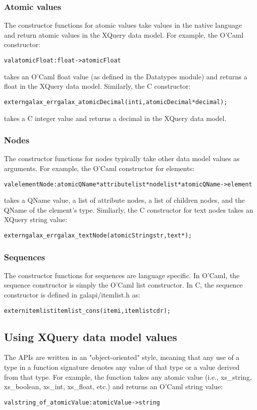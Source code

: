\subsubsection{Atomic values}
  The constructor functions for atomic values take values in the
  native language and return atomic values in the XQuery data
  model.  For example, the O'Caml constructor:
\begin{alltt}
    val atomicFloat   : float -> atomicFloat
\end{alltt}
  takes an O'Caml float value (as defined in the Datatypes module) and
  returns a float in the XQuery data model.  Similarly, the C
  constructor: 

\begin{alltt}
    extern galax\_err galax\_atomicDecimal(int i, atomicDecimal *decimal);
\end{alltt}
  takes a C integer value and returns a decimal in the XQuery data
  model. 

\subsubsection{Nodes}
  The constructor functions for nodes typically take other data model
  values as arguments.  For example, the O'Caml constructor for
  elements: 
\begin{alltt}
    val elementNode : atomicQName * attribute list * node list * atomicQName -> element
\end{alltt}
  takes a QName value, a list of attribute nodes, a list of children
  nodes, and the QName of the element's type.  Simliarly, the C
  constructor for text nodes takes an XQuery string value:
\begin{alltt}
    extern galax\_err galax\_textNode(atomicString str, text *);
\end{alltt}

\subsubsection{Sequences}
  The constructor functions for sequences are language specific.  In
  O'Caml, the sequence constructor is simply the O'Caml list
  constructor.  In C, the sequence constructor is defined in
  galapi/itemlist.h as: 
\begin{alltt}
    extern itemlist itemlist\_cons(item i, itemlist cdr);
\end{alltt}

\subsection{Using XQuery data model values}
  The APIs are written in an "object-oriented" style, meaning that any
  use of a type in a function signature denotes any value of that type
  or a value derived from that type.  For example, the function
   takes any atomic value (i.e., xs\_string,
  xs\_boolean, xs\_int, xs\_float, etc.) and returns an O'Caml string
  value:
\begin{alltt}
    val string\_of\_atomicValue  : atomicValue -> string
\end{alltt}

